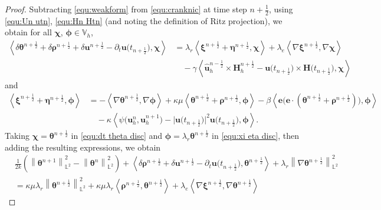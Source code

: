 \documentclass[11pt, reqno]{amsart}
\theoremstyle{definition}
\theoremstyle{remark}
\numberwithin{equation}{section}
\newcommand{\bff}{\boldsymbol}
\newcommand{\bb}{\mathbb}
\newcommand{\norm}[2]{\left\|{#1}\right\|_{#2}}
\newcommand{\inpro}[2]{\left\langle#1,#2\right\rangle}
\begin{document}
\begin{proof}
Subtracting \eqref{equ:weakform} from \eqref{equ:cranknic} at time step $n+\frac{1}{2}$, using \eqref{equ:Un utn}, \eqref{equ:Hn Htn} (and noting the definition of Ritz projection), we obtain for all $\bff{\chi}$, $\bff{\phi}\in \bb{V}_h$,
\begin{align}\label{equ:dt theta disc}
	\nonumber
	\inpro{\delta \bff{\theta}^{n+\frac{1}{2}} + \delta \bff{\rho}^{n+\frac{1}{2}} + \delta \bff{u}^{n+\frac{1}{2}}- \partial_t \bff{u}\big(t_{n+\frac{1}{2}}\big)}{\bff{\chi}}
	&=
	\lambda_r \inpro{\bff{\xi}^{n+\frac{1}{2}}+\bff{\eta}^{n+\frac{1}{2}}}{\bff{\chi}}
	+
	\lambda_e \inpro{\nabla \bff{\xi}^{n+\frac{1}{2}}}{\nabla \bff{\chi}}
	\\
	&\quad 
	-
	\gamma \inpro{\widehat{\bff{u}}_h^{n-\frac{1}{2}} \times \bff{H}_h^{n+\frac{1}{2}} - \bff{u}\big(t_{n+\frac{1}{2}}\big) \times \bff{H}\big(t_{n+\frac{1}{2}}\big)}{\bff{\chi}}
\end{align}
and
\begin{align}
	\nonumber
	\label{equ:xi eta disc}
	\inpro{\bff{\xi}^{n+\frac{1}{2}}+\bff{\eta}^{n+\frac{1}{2}}}{\bff{\phi}}
	&=
	-\inpro{\nabla \bff{\theta}^{n+\frac{1}{2}}}{\nabla \bff{\phi}}
	+
	\kappa\mu \inpro{\bff{\theta}^{n+\frac{1}{2}}+\bff{\rho}^{n+\frac{1}{2}}}{\bff{\phi}}
		-
	\beta \inpro{\bff{e}\big(\bff{e}\cdot (\bff{\theta}^{n+\frac12}+\bff{\rho}^{n+\frac12})\big)}{\bff{\phi}}
	\\
	&\quad 
	-
	\kappa \inpro{\psi\big(\bff{u}_h^n, \bff{u}_h^{n+1}\big) - \big|\bff{u}\big(t_{n+\frac{1}{2}}\big)\big|^2 \bff{u}\big(t_{n+\frac{1}{2}}\big)}{\bff{\phi}}.
\end{align}
Taking $\bff{\chi}= \bff{\theta}^{n+\frac{1}{2}}$ in \eqref{equ:dt theta disc} and $\bff{\phi}=\lambda_r \bff{\theta}^{n+\frac{1}{2}}$ in \eqref{equ:xi eta disc}, then adding the resulting expressions, we obtain
\begin{align}\label{equ:dt theta chi disc}
	\nonumber
	&\frac{1}{2k} \left( \norm{\bff{\theta}^{n+1}}{\bb{L}^2}^2 - \norm{\bff{\theta}^n}{\bb{L}^2}^2 \right)
	+
	\inpro{\delta \bff{\rho}^{n+\frac{1}{2}} + \delta \bff{u}^{n+\frac{1}{2}} -\partial_t \bff{u}\big(t_{n+\frac{1}{2}}\big)}{\bff{\theta}^{n+\frac{1}{2}}}
	+
	\lambda_r \norm{\nabla \bff{\theta}^{n+\frac{1}{2}}}{\bb{L}^2}^2
	\\
	\nonumber
	&=
	\kappa\mu \lambda_r \norm{\bff{\theta}^{n+\frac{1}{2}}}{\bb{L}^2}^2
	+
	\kappa\mu \lambda_r \inpro{\bff{\rho}^{n+\frac{1}{2}}}{\bff{\theta}^{n+\frac{1}{2}}}
	+
	\lambda_e \inpro{\nabla \bff{\xi}^{n+\frac{1}{2}}}{\nabla \bff{\theta}^{n+\frac{1}{2}}}

\end{align}
\end{proof}
\end{document}
